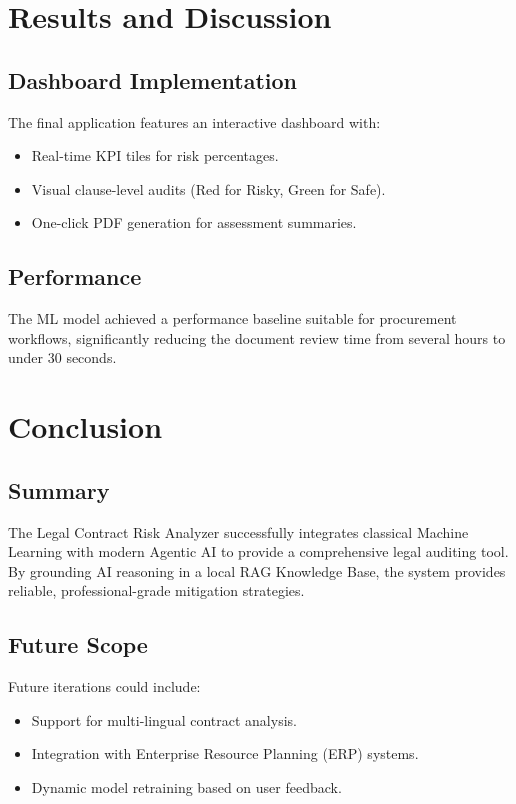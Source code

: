 \documentclass[12pt, a4paper]{report}
\begin{document}
\chapter{Results and Discussion}
\section{Dashboard Implementation}
The final application features an interactive dashboard with:
\begin{itemize}
    \item Real-time KPI tiles for risk percentages.
    \item Visual clause-level audits (Red for Risky, Green for Safe).
    \item One-click PDF generation for assessment summaries.
\end{itemize}

\section{Performance}
The ML model achieved a performance baseline suitable for procurement workflows, significantly reducing the document review time from several hours to under 30 seconds.

\chapter{Conclusion}
\section{Summary}
The Legal Contract Risk Analyzer successfully integrates classical Machine Learning with modern Agentic AI to provide a comprehensive legal auditing tool. By grounding AI reasoning in a local RAG Knowledge Base, the system provides reliable, professional-grade mitigation strategies.

\section{Future Scope}
Future iterations could include:
\begin{itemize}
    \item Support for multi-lingual contract analysis.
    \item Integration with Enterprise Resource Planning (ERP) systems.
    \item Dynamic model retraining based on user feedback.
\end{itemize}
\end{document}
